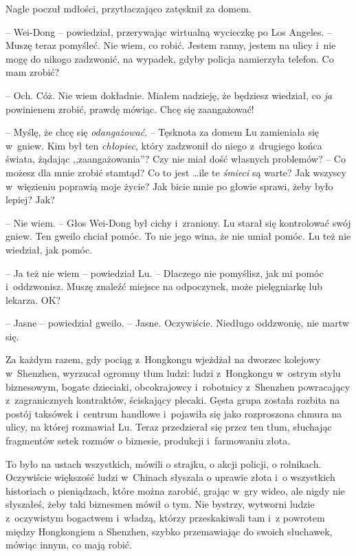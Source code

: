 \documentclass[oneside,polish,11pt,rmheadings]{mwbk}
\begin{document}
Nagle poczuł mdłości, przytłaczająco zatęsknił za domem. 

-- Wei-Dong -- powiedział, przerywając wirtualną wycieczkę po Los Angeles. -- Muszę teraz pomyśleć. Nie wiem, co robić. Jestem ranny, jestem na ulicy i~nie mogę do nikogo zadzwonić, na wypadek, gdyby policja namierzyła telefon. Co mam zrobić? 

-- Och. Cóż. Nie wiem dokładnie. Miałem nadzieję, że będziesz wiedział, co \textit{ja }powinienem zrobić, prawdę mówiąc. Chcę się zaangażować!

-- Myślę, że chcę się \textit{odangażować}. -- Tęsknota za domem Lu zamieniała się w~gniew. Kim był ten \textit{chłopiec}, który zadzwonił do niego z~drugiego końca świata, żądając ,,zaangażowania''? Czy nie miał dość własnych problemów? -- Co możesz dla mnie zrobić stamtąd? Co to jest \ldots  ile te \textit{śmieci }są warte? Jak wszyscy w~więzieniu poprawią moje życie? Jak bicie mnie po głowie sprawi, żeby było lepiej? Jak? 

-- Nie wiem. -- Głos Wei-Dong był cichy i~zraniony. Lu starał się kontrolować swój gniew. Ten gweilo chciał pomóc. To nie jego wina, że nie umiał pomóc. Lu też nie wiedział, jak pomóc.

-- Ja też nie wiem -- powiedział Lu. -- Dlaczego nie pomyślisz, jak mi pomóc i~oddzwonisz. Muszę znaleźć miejsce na odpoczynek, może pielęgniarkę lub lekarza. OK?

-- Jasne -- powiedział gweilo. -- Jasne. Oczywiście. Niedługo oddzwonię, nie martw się.

Za każdym razem, gdy pociąg z~Hongkongu wjeżdżał na dworzec kolejowy w~Shenzhen, wyrzucał ogromny tłum ludzi: ludzi z~Hongkongu w~ostrym stylu biznesowym, bogate dzieciaki, obcokrajowcy i~robotnicy z~Shenzhen powracający z~zagranicznych kontraktów, ściskający plecaki. Gęsta grupa została rozbita na postój taksówek i~centrum handlowe i~pojawiła się jako rozproszona chmura na ulicy, na której rozmawiał Lu. Teraz przedzierał się przez ten tłum, słuchając fragmentów setek rozmów o biznesie, produkcji i~farmowaniu złota.

To było na ustach wszystkich, mówili o strajku, o akcji policji, o rolnikach. Oczywiście większość ludzi w~Chinach słyszała o uprawie złota i~o wszystkich historiach o pieniądzach, które można zarobić, grając w~gry wideo, ale nigdy nie słyszałeś, żeby taki biznesmen mówił o tym. Nie bystrzy, wytworni ludzie z~oczywistym bogactwem i~władzą, którzy przeskakiwali tam i~z powrotem między Hongkongiem a Shenzhen, szybko przemawiając do swoich słuchawek, mówiąc innym, co mają robić.
\end{document}
